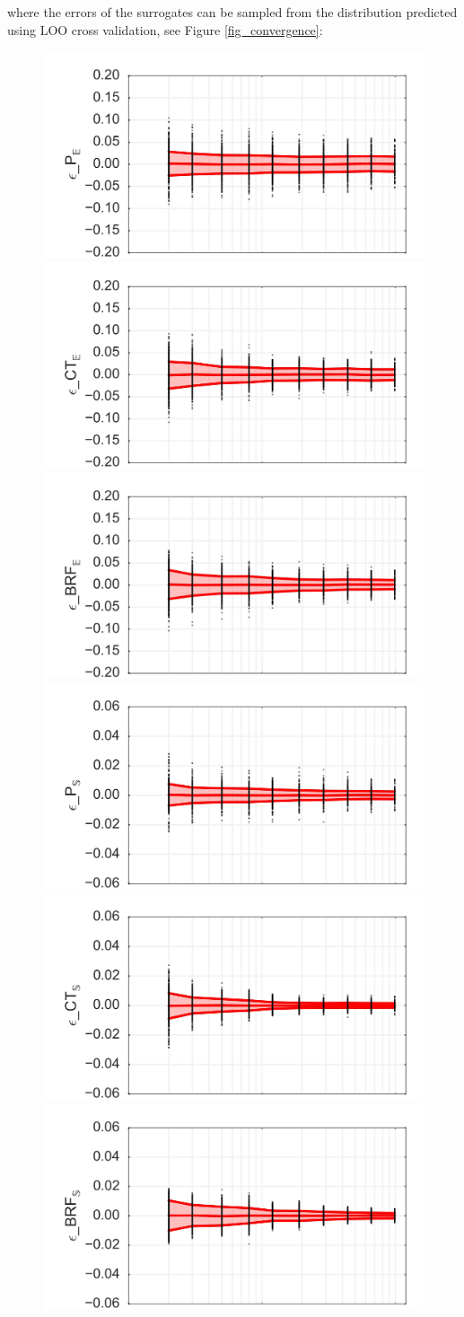 \documentclass[preprint,12pt]{elsarticle}
\begin{document}
\noindent where the errors of the surrogates can be sampled from the distribution predicted using LOO cross validation, see Figure \ref{fig_convergence}:


\begin{figure}[h!]
\begin{centering}
\includegraphics[width=0.32\columnwidth]{Figures/Convergence/CV_E_P.jpg}
\includegraphics[width=0.32\columnwidth]{Figures/Convergence/CV_E_CT.jpg}
\includegraphics[width=0.32\columnwidth]{Figures/Convergence/CV_E_BRFBM_EFL_M12.jpg} \\
\includegraphics[width=0.32\columnwidth]{Figures/Convergence/CV_V_P.jpg}
\includegraphics[width=0.32\columnwidth]{Figures/Convergence/CV_V_CT.jpg}
\includegraphics[width=0.32\columnwidth]{Figures/Convergence/CV_V_BRFBM_EFL_M12.jpg} \\

\end{centering}
\end{figure}
\end{document}
